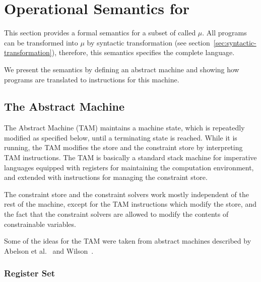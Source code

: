 
\section{Operational Semantics for \turtle{}}
\label{operational-semantics}

This section provides a formal semantics for a subset of \turtle{}
called $\mu$\turtle{}.  All \turtle{} programs can be transformed into
$\mu$\turtle{} by syntactic transformation (see
section~\ref{sec:syntactic-transformation}), therefore, this semantics
specifies the complete \turtle{} language.

We present the semantics by defining an abstract machine and showing
how \turtle{} programs are translated to instructions for this
machine.

\subsection{The \turtle{} Abstract Machine}

The \turtle{} Abstract Machine (TAM) maintains a machine state, which
is repeatedly modified as specified below, until a terminating state
is reached.  While it is running, the TAM modifies the store and the
constraint store by interpreting TAM instructions.  The TAM is
basically a standard stack machine for imperative languages equipped
with registers for maintaining the computation environment, and
extended with instructions for managing the constraint store.

The constraint store and the constraint solvers work mostly
independent of the rest of the machine, except for the TAM
instructions which modify the store, and the fact that the constraint
solvers are allowed to modify the contents of constrainable variables.

Some of the ideas for the TAM were taken from abstract machines
described by Abelson et al.~\cite{abelson96sicp} and
Wilson~\cite{wilson03schintro}.

\subsubsection{Register Set}

